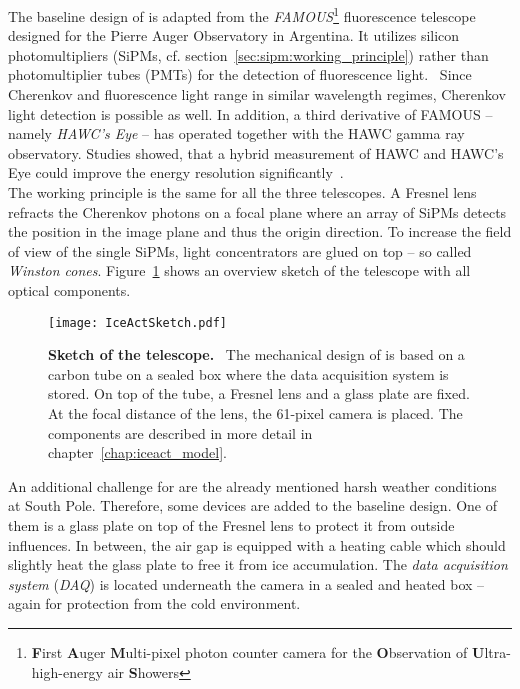 The baseline design of \iceact is adapted from the \textit{FAMOUS}\footnote{\textbf{F}irst \textbf{A}uger \textbf{M}ulti-pixel photon counter camera for the \textbf{O}bservation of \textbf{U}ltra-high-energy air \textbf{S}howers} fluorescence telescope designed for the Pierre Auger Observatory in Argentina. It utilizes silicon photomultipliers (SiPMs, cf. section~\ref{sec:sipm:working_principle}) rather than photomultiplier tubes (PMTs) for the detection of fluorescence light.~\cite{famous:telescope} Since Cherenkov and fluorescence light range in similar wavelength regimes, Cherenkov light detection is possible as well. In addition, a third derivative of FAMOUS -- namely \textit{HAWC's Eye} -- has operated together with the HAWC gamma ray observatory. Studies showed, that a hybrid measurement of HAWC and HAWC's Eye could improve the energy resolution significantly~\cite{hawcseye:merlin}.\\

The working principle is the same for all the three telescopes. A Fresnel lens refracts the Cherenkov photons on a focal plane where an array of SiPMs detects the position in the image plane and thus the origin direction. To increase the field of view of the single SiPMs, light concentrators are glued on top -- so called \textit{Winston cones}. Figure~\ref{iceact:sketch} shows an overview sketch of the \iceact telescope with all optical components.\\

\begin{figure}[H]
	\centering
	\texttt{[image: IceActSketch.pdf]}
	\caption[Sketch of the \iceact telescope]{\textbf{Sketch of the \iceact telescope.}~\cite{iceact:erik} The mechanical design of \iceact is based on a carbon tube on a sealed box where the data acquisition system is stored. On top of the tube, a Fresnel lens and a glass plate are fixed. At the focal distance of the lens, the \num{61}-pixel camera is placed. The components are described in more detail in chapter~\ref{chap:iceact_model}.}
	\label{iceact:sketch}
\end{figure}

An additional challenge for \iceact are the already mentioned harsh weather conditions at South Pole. Therefore, some devices are added to the baseline design. One of them is a glass plate on top of the Fresnel lens to protect it from outside influences. In between, the air gap is equipped with a heating cable which should slightly heat the glass plate to free it from ice accumulation. The \textit{data acquisition system} (\textit{DAQ}) is located underneath the camera in a sealed and heated box -- again for protection from the cold environment.\\

